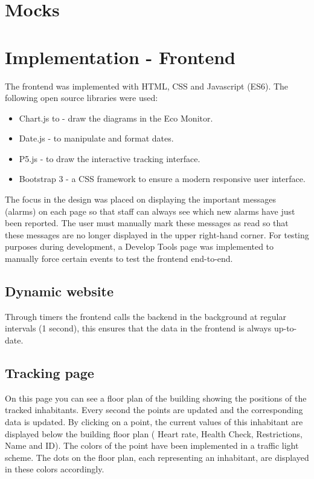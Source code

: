 \section{Mocks}

\section{Implementation - Frontend}

The frontend was implemented with HTML, CSS and Javascript (ES6).
The following open source libraries were used:
\begin{itemize}

\item Chart.js to -  draw the diagrams in the Eco Monitor.
\item Date.js - to manipulate and format dates.
\item P5.js - to draw the interactive tracking interface.
\item Bootstrap 3 - a CSS framework to ensure a modern responsive user interface.
\end{itemize}


The focus in the design was placed on displaying the important messages (alarms) on each page so that staff can always see which new alarms have just been reported.
The user must manually mark these messages as read so that these messages are no longer displayed in the upper right-hand corner. For testing purposes during development, a Develop Tools page was implemented to manually force certain events to test the frontend end-to-end.

\subsection{Dynamic website}
Through timers the frontend calls the backend in the background at regular intervals (1 second), this ensures that the data in the frontend is always up-to-date.

\subsection{Tracking page}
On this page you can see a floor plan of the building showing the positions of the tracked inhabitants.
Every second the points are updated and the corresponding data is updated.
By clicking on a point, the current values of this inhabitant are displayed below the building floor plan ( Heart rate, Health Check, Restrictions, Name and ID).
The colors of the point have been implemented in a traffic light scheme. The dots on the floor plan, each representing an inhabitant, are displayed in these colors accordingly.


